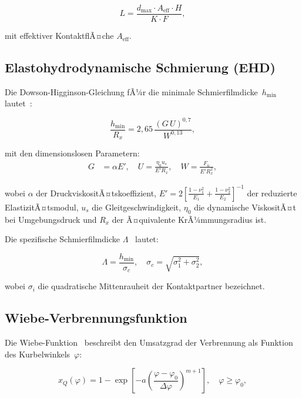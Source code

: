 ﻿\documentclass[12pt,a4paper]{article}
\begin{document}
\begin{equation}
  L = \frac{d_{\max} \cdot A_{\mathrm{eff}} \cdot H}{K \cdot F},
  \label{eq:lebensdauer_archard}
\end{equation}

mit effektiver KontaktflÃ¤che $A_{\mathrm{eff}}$.

\subsection{Elastohydrodynamische Schmierung (EHD)}
\label{sec:grundlagen_ehd}

Die Dowson-Higginson-Gleichung fÃ¼r die minimale Schmierfilmdicke~$h_{\min}$
lautet~\cite{dowson1977}:

\begin{equation}
  \frac{h_{\min}}{R_x} = 2{,}65\,
  \frac{(G\,U)^{0{,}7}}{W^{0{,}13}},
  \label{eq:dhg}
\end{equation}

mit den dimensionslosen Parametern:
\begin{align}
  G &= \alpha E', \quad
  U = \frac{\eta_0 u_s}{E' R_x}, \quad
  W = \frac{F_n}{E' R_x^2},
\end{align}

wobei $\alpha$ der DruckviskositÃ¤tskoeffizient, $E' = 2\left[
\frac{1-\nu_1^2}{E_1} + \frac{1-\nu_2^2}{E_2}\right]^{-1}$ der
reduzierte ElastizitÃ¤tsmodul, $u_s$ die Gleit\-geschwindigkeit,
$\eta_0$ die dynamische ViskositÃ¤t bei Umgebungsdruck und $R_x$
der Ã¤quivalente KrÃ¼mmungsradius ist.

Die spezifische Schmierfilmdicke $\Lambda$~\cite{hamrock1994} lautet:

\begin{equation}
  \Lambda = \frac{h_{\min}}{\sigma_c}, \quad
  \sigma_c = \sqrt{\sigma_1^2 + \sigma_2^2},
  \label{eq:lambda}
\end{equation}

wobei $\sigma_i$ die quadratische Mittenrauheit der Kontaktpartner bezeichnet.

\subsection{Wiebe-Verbrennungsfunktion}
\label{sec:grundlagen_wiebe}

Die Wiebe-Funktion~\cite{wiebe1970} beschreibt den Umsatzgrad der
Verbrennung als Funktion des Kurbelwinkels~$\varphi$:

\begin{equation}
  x_Q(\varphi) = 1 - \exp\!\left[-a \left(\frac{\varphi - \varphi_0}{\Delta\varphi}\right)^{m+1}\right],
  \quad \varphi \geq \varphi_0,
  \label{eq:wiebe}
\end{equation}
\end{document}

